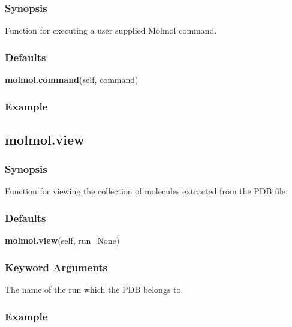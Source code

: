 \subsubsection{Synopsis}

Function for executing a user supplied Molmol command.

\subsubsection{Defaults}

\textsf{\textbf{molmol.command}(self, command)}


\subsubsection{Example}




\newpage

\subsection{molmol.view}


\subsubsection{Synopsis}

Function for viewing the collection of molecules extracted from the PDB file.

\subsubsection{Defaults}

\textsf{\textbf{molmol.view}(self, run=None)}


\subsubsection{Keyword Arguments}


  The name of the run which the PDB belongs to.

\subsubsection{Example}





